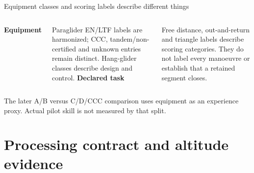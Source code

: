 \documentclass[11pt,aspectratio=169]{beamer}
\begin{document}
\begin{frame}{Equipment classes and scoring labels describe different things}
\begin{columns}[T,onlytextwidth]
\textbf{Equipment}\par\medskip
Paraglider EN/LTF labels are harmonized; CCC, tandem/non-certified and unknown
entries remain distinct. Hang-glider classes describe design and control.
\textbf{Declared task}\par\medskip
Free distance, out-and-return and triangle labels describe scoring categories.
They do not label every manoeuvre or establish that a retained segment closes.
\end{columns}
\par\medskip
The later A/B versus C/D/CCC comparison uses equipment as an experience proxy.
Actual pilot skill is not measured by that split.
\end{frame}

\section{Processing contract and altitude evidence}
\end{document}
